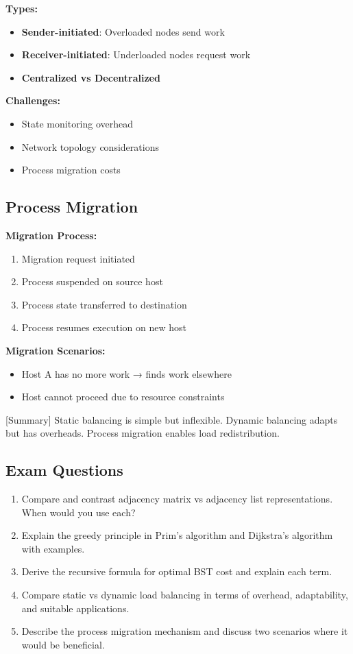 \documentclass[12pt]{article}
\begin{document}
\textbf{Types:}
\begin{itemize}
    \item \textbf{Sender-initiated}: Overloaded nodes send work
    \item \textbf{Receiver-initiated}: Underloaded nodes request work
    \item \textbf{Centralized vs Decentralized}
\end{itemize}

\textbf{Challenges:}
\begin{itemize}
    \item State monitoring overhead
    \item Network topology considerations
    \item Process migration costs
\end{itemize}

\subsection{Process Migration}

\textbf{Migration Process:}
\begin{enumerate}
    \item Migration request initiated
    \item Process suspended on source host
    \item Process state transferred to destination
    \item Process resumes execution on new host
\end{enumerate}

\textbf{Migration Scenarios:}
\begin{itemize}
    \item Host A has no more work → finds work elsewhere
    \item Host cannot proceed due to resource constraints
\end{itemize}

[Summary] Static balancing is simple but inflexible. Dynamic balancing adapts but has overheads. Process migration enables load redistribution.

\subsection*{Exam Questions}

\begin{enumerate}
    \item Compare and contrast adjacency matrix vs adjacency list representations. When would you use each?
    \item Explain the greedy principle in Prim's algorithm and Dijkstra's algorithm with examples.
    \item Derive the recursive formula for optimal BST cost and explain each term.
    \item Compare static vs dynamic load balancing in terms of overhead, adaptability, and suitable applications.
    \item Describe the process migration mechanism and discuss two scenarios where it would be beneficial.
\end{enumerate}
\end{document}
